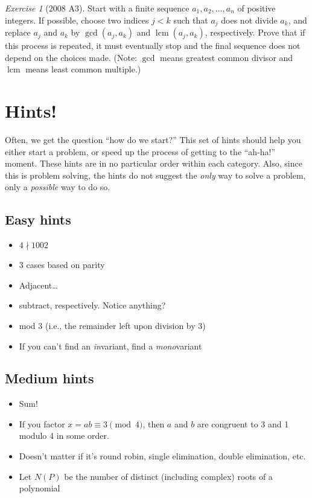 \documentclass{article}
\theoremstyle{definition}
\theoremstyle{remark}
\newtheorem{exercise}{Exercise}
\DeclareMathOperator{\lcm}{lcm}
\begin{document}
    \begin{exercise}[2008 A3]
    Start with a finite sequence $a_1,a_2,\dots,a_n$ of positive integers. If possible, choose two indices $j < k$ such that $a_j$ does not divide $a_k$, and replace $a_j$ and $a_k$ by $\gcd(a_j , a_k )$ and $\lcm(a_j , a_k )$, respectively. Prove that if this process is repeated, it must eventually stop and the final sequence does not depend on the choices made. (Note: $\gcd$ means greatest common divisor and $\lcm$ means least common multiple.)
    \end{exercise}

\pagebreak

\section{Hints!}

    Often, we get the question ``how do we start?'' This set of hints should help you either start a problem, or speed up the process of getting to the ``ah-ha!'' moment. These hints are in no particular order within each category. Also, since this is problem solving, the hints do not suggest the \textit{only} way to solve a problem, only a \textit{possible} way to do so.

    \subsection{Easy hints}

    \begin{itemize}
        \item \(4\nmid 1002\)
        \item 3 cases based on parity
        \item Adjacent\dots
        \item subtract, respectively. Notice anything?
        \item mod 3 (i.e., the remainder left upon division by 3)
        \item If you can't find an \textit{in}variant, find a \textit{mono}variant
    \end{itemize}

    \subsection{Medium hints}

    \begin{itemize}
        \item Sum!
        \item If you factor \(x=ab\equiv 3\pmod{4}\), then \(a\) and \(b\) are congruent to 3 and 1 modulo 4 in some order.
        \item Doesn't matter if it's round robin, single elimination, double elimination, etc.
        \item Let \(N(P)\) be the number of distinct (including complex) roots of a polynomial
    \end{itemize}
\end{document}
